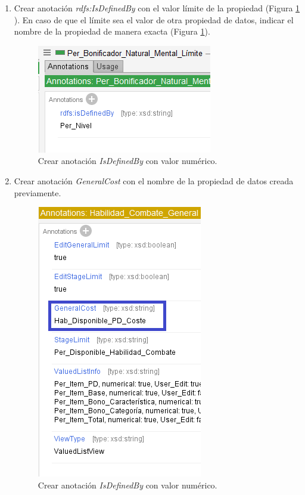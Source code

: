 \begin{enumerate}
    \item Crear anotación \textit{rdfs:IsDefinedBy} con el valor límite de la propiedad
    (Figura \ref*{MultipleChoice_4} ). En caso de que el límite sea el valor de otra propiedad de datos, indicar 
    el nombre de la propiedad de manera exacta (Figura \ref*{MultipleChoice_4}).
    \begin{figure}[H]
        \centering
        \includegraphics[scale=0.6]{Figures/Protege/MultipleChoice_4.png}
        \caption{Crear anotación \textit{IsDefinedBy} con valor numérico.}
        \label{MultipleChoice_4}
    \end{figure}
    \item Crear anotación \textit{GeneralCost} con el nombre de la propiedad de datos creada previamente.
    \begin{figure}[H]
        \centering
        \includegraphics[scale=0.6]{Figures/Protege/MultipleChoice_5.png}
        \caption{Crear anotación \textit{IsDefinedBy} con valor numérico.}
        \label{MultipleChoice_5}
    \end{figure}

\end{enumerate}

